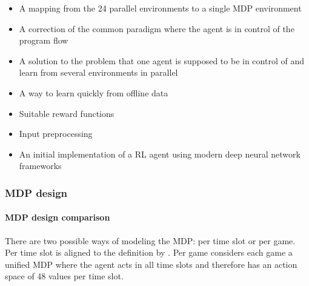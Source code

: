 \begin{itemize}
    \itemsep0em
    \item A mapping from the 24 parallel environments to a single \ac{MDP} environment
    \item A correction of the common paradigm where the agent is in control of the program flow
    \item A solution to the problem that one agent is supposed to be in control of and learn from several
        environments in parallel
    \item A way to learn quickly from offline data
    \item Suitable reward functions
    \item Input preprocessing
    \item An initial implementation of a \ac{RL} agent using modern deep neural network frameworks
\end{itemize}

\subsubsection{MDP design}%
\label{sub:mdp_modelling_comparison}

\paragraph{\ac{MDP} design comparison}%
\label{ssub:mdp_design_comparison}

There are two possible ways of modeling the \ac{MDP}: per time slot or per game. Per time slot is aligned to the
definition by \citet{tactexurieli2016mdp}. Per game considers each game a unified \ac{MDP} where the agent acts in all
time slots and therefore has an action space of 48 values per time slot.


